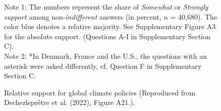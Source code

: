 \begin{figure}[h!]
  \caption[Relative support for global climate policies]{Relative support for global climate policies (Reproduced from Dechezleprêtre et al. (2022),\cite{dechezlepretre_fighting_2022} Figure A21.).} %
  \label{fig:oecd} %
  {\footnotesize %
  Note 1: The numbers represent the share of \textit{Somewhat} or \textit{Strongly support} among non-\textit{indifferent} answers (in percent, $n$ = 40,680). The color blue denotes a relative majority. See Supplementary Figure A3 for the absolute support. (Questions A-I in Supplementary Section C).
  \\ Note 2: *In Denmark, France and the U.S., the questions with an asterisk were asked differently, cf. Question F in Supplementary Section C.%
  } 
\end{figure}

